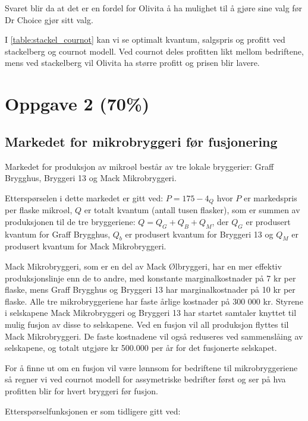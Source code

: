 \documentclass[
  12pt,
  a4paper,
  DIV=11,
  numbers=noendperiod]{scrartcl}
\begin{document}
Svaret blir da at det er en fordel for Olivita å ha mulighet til å gjøre
sine valg før Dr Choice gjør sitt valg.

I \autoref{table:stackel_cournot} kan vi se optimalt kvantum, salgspris
og profitt ved stackelberg og cournot modell. Ved cournot deles
profitten likt mellom bedriftene, mens ved stackelberg vil Olivita ha
større profitt og prisen blir lavere.

\clearpage

\section{Oppgave 2 (70\%)}\label{oppgave-2-70}

\subsection{Markedet for mikrobryggeri før
fusjonering}\label{markedet-for-mikrobryggeri-fuxf8r-fusjonering}

Markedet for produksjon av mikroøl består av tre lokale bryggerier:
Graff Brygghus, Bryggeri 13 og Mack Mikrobryggeri.

Etterspørselen i dette markedet er gitt ved: \(P = 175 − 4_Q\) hvor
\(P\) er markedspris per flaske mikroøl, \(Q\) er totalt kvantum (antall
tusen flasker), som er summen av produksjonen til de tre bryggeriene:
\(Q = Q_G + Q_B + Q_M\), der \(Q_G\) er produsert kvantum for Graff
Brygghus, \(Q_b\) er produsert kvantum for Bryggeri 13 og \(Q_M\) er
produsert kvantum for Mack Mikrobryggeri.

Mack Mikrobryggeri, som er en del av Mack Ølbryggeri, har en mer
effektiv produksjonslinje enn de to andre, med konstante
marginalkostnader på 7 kr per flaske, mens Graff Brygghus og Bryggeri 13
har marginalkostnader på 10 kr per flaske. Alle tre mikrobryggeriene har
faste årlige kostnader på 300 000 kr. Styrene i selskapene Mack
Mikrobryggeri og Bryggeri 13 har startet samtaler knyttet til mulig
fusjon av disse to selskapene. Ved en fusjon vil all produksjon flyttes
til Mack Mikrobryggeri. De faste kostnadene vil også reduseres ved
sammenslåing av selskapene, og totalt utgjøre kr 500.000 per år for det
fusjonerte selskapet.

For å finne ut om en fusjon vil være lønnsom for bedriftene til
mikrobryggeriene så regner vi ved cournot modell for assymetriske
bedrifter først og ser på hva profitten blir for hvert bryggeri før
fusjon.

Etterspørselfunksjonen er som tidligere gitt ved:
\end{document}
